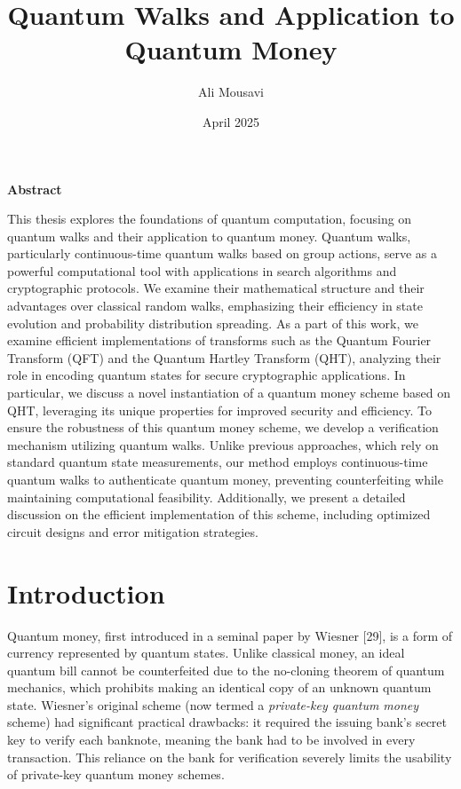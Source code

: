 \documentclass[12pt]{report}
\title{Quantum Walks and Application to Quantum Money}
\author{Ali Mousavi}
\date{April 2025}
\begin{document}
\maketitle
\tableofcontents


\newpage
\textbf{Abstract}

This thesis explores the foundations of quantum computation, focusing on quantum walks and their application to quantum money. Quantum walks, particularly continuous-time quantum walks based on group actions, serve as a powerful computational tool with applications in search algorithms and cryptographic protocols. We examine their mathematical structure and their advantages over classical random walks, emphasizing their efficiency in state evolution and probability distribution spreading. As a part of this work, we examine efficient implementations of transforms such as the Quantum Fourier Transform (QFT) and the Quantum Hartley Transform (QHT), analyzing their role in encoding quantum states for secure cryptographic applications. In particular, we discuss a novel instantiation of a quantum money scheme based on QHT, leveraging its unique properties for improved security and efficiency.
To ensure the robustness of this quantum money scheme, we develop a verification mechanism utilizing quantum walks. Unlike previous approaches, which rely on standard quantum state measurements, our method employs continuous-time quantum walks to authenticate quantum money, preventing counterfeiting while maintaining computational feasibility. Additionally, we present a detailed discussion on the efficient implementation of this scheme, including optimized circuit designs and error mitigation strategies.








\chapter{Introduction}
Quantum money, first introduced in a seminal paper by Wiesner [29], is a form of currency represented by quantum states. Unlike classical money, an ideal quantum bill cannot be counterfeited due to the no-cloning theorem of quantum mechanics, which prohibits making an identical copy of an unknown quantum state. Wiesner’s original scheme (now termed a \emph{private-key quantum money} scheme) had significant practical drawbacks: it required the issuing bank’s secret key to verify each banknote, meaning the bank had to be involved in every transaction. This reliance on the bank for verification severely limits the usability of private-key quantum money schemes.
\end{document}
